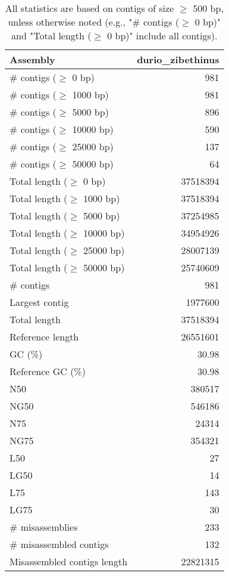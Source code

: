 \documentclass[12pt,a4paper]{article}
\begin{document}
\begin{table}[ht]
\begin{center}
\caption{All statistics are based on contigs of size $\geq$ 500 bp, unless otherwise noted (e.g., "\# contigs ($\geq$ 0 bp)" and "Total length ($\geq$ 0 bp)" include all contigs).}
\begin{tabular}{|l*{1}{|r}|}
\hline
Assembly & durio\_zibethinus \\ \hline
\# contigs ($\geq$ 0 bp) & 981 \\ \hline
\# contigs ($\geq$ 1000 bp) & 981 \\ \hline
\# contigs ($\geq$ 5000 bp) & 896 \\ \hline
\# contigs ($\geq$ 10000 bp) & 590 \\ \hline
\# contigs ($\geq$ 25000 bp) & 137 \\ \hline
\# contigs ($\geq$ 50000 bp) & 64 \\ \hline
Total length ($\geq$ 0 bp) & 37518394 \\ \hline
Total length ($\geq$ 1000 bp) & 37518394 \\ \hline
Total length ($\geq$ 5000 bp) & 37254985 \\ \hline
Total length ($\geq$ 10000 bp) & 34954926 \\ \hline
Total length ($\geq$ 25000 bp) & 28007139 \\ \hline
Total length ($\geq$ 50000 bp) & 25740609 \\ \hline
\# contigs & 981 \\ \hline
Largest contig & 1977600 \\ \hline
Total length & 37518394 \\ \hline
Reference length & 26551601 \\ \hline
GC (\%) & 30.98 \\ \hline
Reference GC (\%) & 30.98 \\ \hline
N50 & 380517 \\ \hline
NG50 & 546186 \\ \hline
N75 & 24314 \\ \hline
NG75 & 354321 \\ \hline
L50 & 27 \\ \hline
LG50 & 14 \\ \hline
L75 & 143 \\ \hline
LG75 & 30 \\ \hline
\# misassemblies & 233 \\ \hline
\# misassembled contigs & 132 \\ \hline
Misassembled contigs length & 22821315 \\ \hline

\end{tabular}
\end{center}
\end{table}
\end{document}
